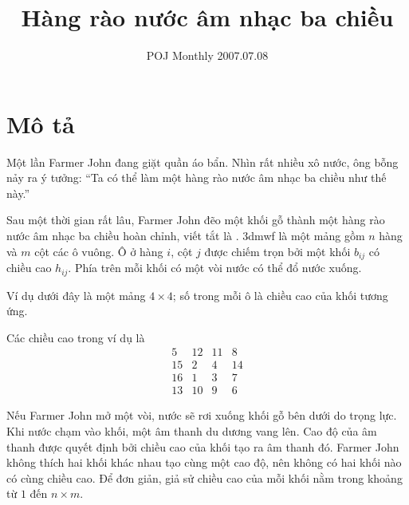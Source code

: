 \documentclass[11pt]{article}
\title{Hàng rào nước âm nhạc ba chiều}
\author{POJ Monthly 2007.07.08}
\date{}
\begin{document}
\maketitle


\section{Mô tả}

Một lần Farmer John đang giặt quần áo bẩn. Nhìn rất nhiều xô nước, ông bỗng
nảy ra ý tưởng: ``Ta có thể làm một hàng rào nước âm nhạc ba chiều như thế
này.''

Sau một thời gian rất lâu, Farmer John đẽo một khối gỗ thành một hàng rào
nước âm nhạc ba chiều hoàn chỉnh, viết tắt là . 3dmwf là một mảng
gồm \(n\) hàng và \(m\) cột các ô vuông. Ô ở hàng \(i\), cột \(j\) được chiếm
trọn bởi một khối \(b_{ij}\) có chiều cao \(h_{ij}\). Phía trên mỗi khối có
một vòi nước có thể đổ nước xuống.

Ví dụ dưới đây là một mảng \(4\times 4\); số trong mỗi ô là chiều cao của khối
tương ứng.

\begin{center}
\end{center}

Các chiều cao trong ví dụ là
\[
\begin{array}{rrrr}
5 & 12 & 11 & 8\\
15 & 2 & 4 & 14\\
16 & 1 & 3 & 7\\
13 & 10 & 9 & 6
\end{array}
\]

Nếu Farmer John mở một vòi, nước sẽ rơi xuống khối gỗ bên dưới do trọng lực.
Khi nước chạm vào khối, một âm thanh du dương vang lên. Cao độ của âm thanh
được quyết định bởi chiều cao của khối tạo ra âm thanh đó. Farmer John không
thích hai khối khác nhau tạo cùng một cao độ, nên không có hai khối nào có
cùng chiều cao. Để đơn giản, giả sử chiều cao của mỗi khối nằm trong khoảng
từ \(1\) đến \(n\times m\).
\end{document}
